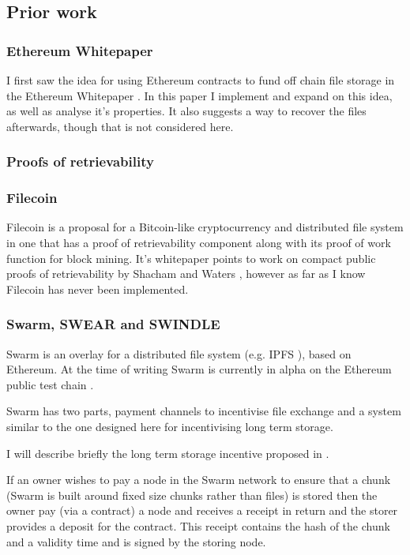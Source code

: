\documentclass[10pt,twoside,a4paper]{article}
\begin{document}
\subsection{Prior work}

\subsubsection{Ethereum Whitepaper}

I first saw the idea for using Ethereum contracts to fund off chain file storage in the Ethereum Whitepaper \cite{eth-whitepaper}.
In this paper I implement and expand on this idea, as well as analyse it's properties.
It also suggests a way to recover the files afterwards, though that is not considered here.

\subsubsection{Proofs of retrievability}

\subsubsection{Filecoin}

Filecoin is a proposal for a Bitcoin-like cryptocurrency and distributed file system in one
that has a proof of retrievability component along with its proof of work function for block mining.
It's whitepaper \cite{filecoin} points to work on compact public proofs of retrievability by Shacham and Waters \cite{compact-por},
however as far as I know Filecoin has never been implemented.

\subsubsection{Swarm, SWEAR and SWINDLE}

Swarm is an overlay for a distributed file system (e.g. IPFS \cite{ipfs}), based on Ethereum.
At the time of writing Swarm is currently in alpha on the Ethereum public test chain \cite{swarm-alpha}.

Swarm has two parts, payment channels to incentivise file exchange and a system similar to the one designed here for incentivising long term storage.

I will describe briefly the long term storage incentive proposed in \cite{swarm-swear-swindle}.

If an owner wishes to pay a node in the Swarm network to ensure that a chunk (Swarm is built around fixed size chunks rather than files)
is stored then the owner pay (via a contract) a node and receives a receipt in return and the storer provides a deposit for the contract.
This receipt contains the hash of the chunk and a validity time and is signed by the storing node.
\end{document}
